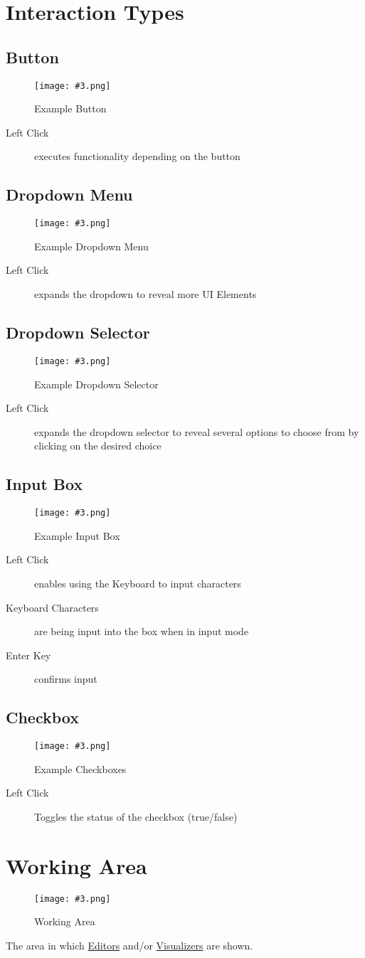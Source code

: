 \documentclass[10pt,a4paper]{report}
\newcommand{\refer}[2]{\hyperref[#1]{\textcolor{col:reference}{#2}}}
\newcommand{\h}[1]{\textcolor{col:highlight}{#1}}
\newcommand{\defit}[3]{\subsection{#2}\label{it:#1}#3}
\newcommand{\includeimage}[5]{
    \begin{figure}[H]
        #1
        \texttt{[image: \#3.png]}
        \caption{#4}
        \label{fig:#5}
    \end{figure}
}
\begin{document}
\section{Interaction Types}
\defit{button}{Button}{
    \includeimage{}{0.7}{Button}{Example Button}{Example Button}
    \begin{description}
        \item[Left Click]{executes functionality depending on the button}
    \end{description}
}
\defit{dropdown_menu}{Dropdown Menu}{
    \includeimage{}{0.7}{Example Dropdown Menu}{Example Dropdown Menu}{Example Dropdown Menu}
    \begin{description}
            \item[Left Click]{expands the dropdown to reveal more UI Elements}
    \end{description}
}
\defit{dropdown_selector}{Dropdown Selector}{
    \includeimage{}{0.7}{Example Dropdown Selector}{Example Dropdown Selector}{Example Dropdown Selector}
    \begin{description}
            \item[Left Click]{expands the dropdown selector to reveal several options to choose from by clicking on the desired choice}
    \end{description}
}
\defit{input_box}{Input Box}{
    \includeimage{}{0.7}{Editor Search Bar}{Example Input Box}{Example Input Box}
    \begin{description}
        \item[Left Click]{enables using the Keyboard to input characters}
        \item[Keyboard Characters]{are being input into the box when in \h{input mode}}
        \item[Enter Key]{confirms input}
    \end{description}
}
\defit{checkbox}{Checkbox}{
    \includeimage{}{0.7}{Example Checkboxes}{Example Checkboxes}{Example Checkboxes}
    \begin{description}
        \item[Left Click]{Toggles the status of the checkbox (true/false)}
    \end{description}
}

\section{Working Area}
\label{sec:working_area}
\includeimage{}{0.25}{Working Area}{Working Area}{Working Area}
The area in which \refer{sec:editor}{Editors} and/or \refer{sec:visualizer}{Visualizers} are shown.
\end{document}

